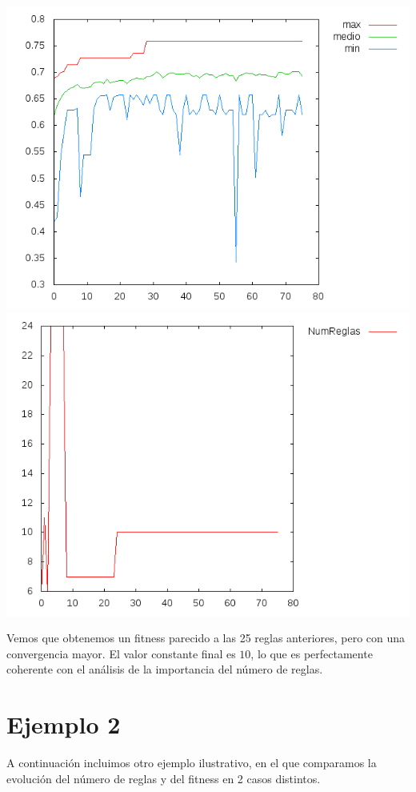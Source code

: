 \documentclass[nochap]{apuntes}
\begin{document}
\begin{center}
\includegraphics[scale=0.4]{tex/img/g76_p76_ReemplazoTotal_SeleccionProporcionalAlFitness_reg11.png}
\includegraphics[scale=0.4]{tex/img/g76_p76_ReemplazoTotal_SeleccionProporcionalAlFitness_reg11_reglas.png}
\end{center}

Vemos que obtenemos un fitness parecido a las 25 reglas anteriores, pero con una convergencia mayor. El valor constante final es $10$, lo que es perfectamente coherente con el análisis de la importancia del número de reglas.


\section{Ejemplo 2}
A continuación incluimos otro ejemplo ilustrativo, en el que comparamos la evolución del número de reglas y del fitness en 2 casos distintos.
\end{document}
